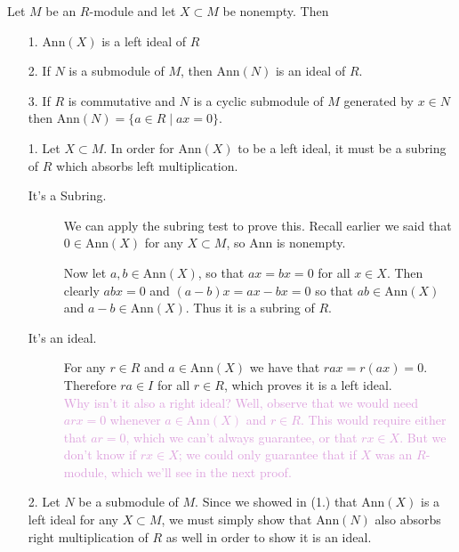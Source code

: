 \documentclass[12pt,letterpaper]{algebra_book}
\newcommand{\ann}{\mbox{Ann}}
\theoremstyle{definition}
\begin{document}
\begin{proposition}
    Let $M$ be an $R$-module and let $X \subset M$ be nonempty. Then 
    \begin{itemize}
        \item[1.] $\ann(X)$ is a left ideal of $R$
        \item[2.] If $N$ is a submodule of $M$, then $\ann(N)$
        is an ideal of $R$.
        \item[3.] If $R$ is commutative and $N$ is a cyclic submodule of $M$ generated by $x \in
        N$ then $\ann(N) = \{a \in R \mid ax = 0 \}$.
    \end{itemize}
\end{proposition}

\begin{prf}
    \begin{itemize}
        \item[1.] 
        Let $X \subset M$. In order for $\ann(X)$ to be a left ideal, it must be a subring of
        $R$ which absorbs left multiplication. 
        \begin{description}
            \item[It's a Subring.] We can apply the subring test to
            prove this. Recall earlier we said that $0 \in \ann(X)$
            for any $X \subset M$, so $\ann$ is nonempty. 
            
            Now let $a, b \in \ann(X)$, so that $ax = bx = 0$ for all
            $x \in X$. Then clearly $abx = 0$ and $(a - b)x = ax -bx
            = 0$ so that $ab \in \ann(X)$ and $a-b \in \ann(X)$. Thus
            it is a subring of $R$.

            \item[It's an ideal.] For any $r \in R$ and $a \in
            \ann(X)$ we have that $rax = r(ax) = 0$. Therefore
            $ra\in I$ for all $r \in R$, which proves it is a left
            ideal. 
            \\
            \textcolor{Plum}{Why isn't it also a right ideal? Well,
            observe that we would need $arx = 0$ whenever $a \in
            \ann(X)$ and $r \in R$. This would require either that
            $ar = 0$, which we can't always guarantee, or that $rx
            \in X$. But we don't know if $rx \in X$; we could only
            guarantee that if $X$ was an $R$-module, which we'll
            see in the next proof.
            }
        \end{description} 

        \item[2.] Let $N$ be a submodule of $M$. Since we showed
        in (1.) that $\ann(X)$ is a left
        ideal for any $X \subset M$, we must simply show that
        $\ann(N)$ also absorbs right multiplication of $R$ as well in
        order to show it is an ideal.


\end{itemize}
\end{prf}
\end{document}

